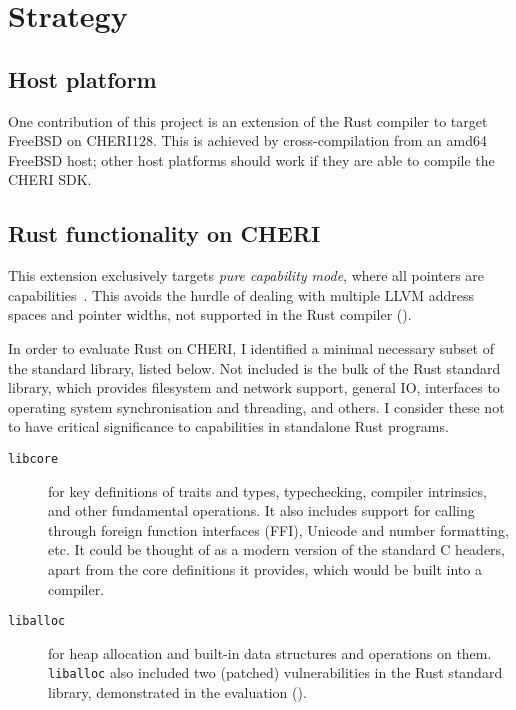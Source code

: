 \documentclass[dissertation.tex]{subfiles}
\begin{document}
\section{Strategy}
\label{sec:impl-what}

\subsection{Host platform}
One contribution of this project is an extension of the Rust compiler to
target FreeBSD on CHERI128.
This is achieved by cross-compilation from an amd64 FreeBSD host; other
host platforms should work if they are able to compile the CHERI SDK.

\subsection{Rust functionality on CHERI}
This extension exclusively targets \emph{pure capability mode}, where
all pointers are capabilities~\cite{cheri-prog-guide}.
This avoids the hurdle of dealing with multiple LLVM address spaces and
pointer widths, not supported in the Rust compiler
().

In order to evaluate Rust on CHERI, I identified
a minimal necessary subset of the standard library, listed below.
Not included is the bulk of the Rust standard library, which provides
filesystem and network support, general IO, interfaces to operating
system synchronisation and threading, and others.
I consider these not to have critical significance to capabilities in
standalone Rust programs.

\begin{description}
    \item[\texttt{libcore}] for key definitions of traits and types,
    typechecking, compiler intrinsics, and other fundamental operations.
    It also includes support for calling through foreign function
    interfaces (FFI), Unicode and number formatting, etc.
    It could be thought of as a modern version of the standard C
    headers, apart from the core definitions it provides, which would be
    built into a compiler.
    \item[\texttt{liballoc}] for heap allocation and built-in data
    structures and operations on them.
    \texttt{liballoc} also included two (patched) vulnerabilities in the
    Rust standard library, demonstrated in the evaluation
    ().
\end{description}
\end{document}
